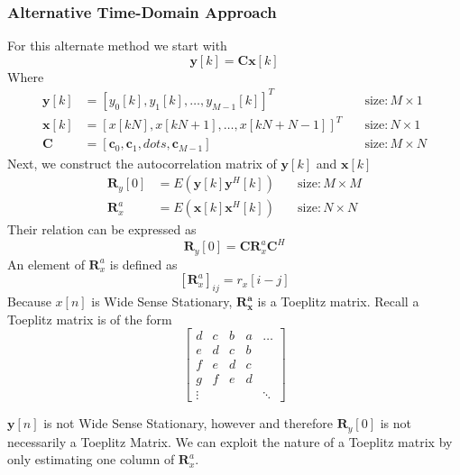 \documentclass[report, oneside, a4paper, openany]{memoir}
\begin{document}
\subsubsection{Alternative Time-Domain Approach}
For this alternate method we start with 
$$
\mathbf{y}[k] = \mathbf{Cx}[k]
$$
Where 
\begin{equation*}
\begin{alignedat}{2}
\mathbf{y}[k] &= [y_0[k], y_1[k],\dots,y_{M-1}[k]]^T \quad &\text{size}: M \times 1\\
\mathbf{x}[k] &= [x[kN],x[kN+1],\dots, x[kN+N-1]]^T \quad &\text{size}: N \times 1\\
\mathbf{C} &= [\mathbf{c}_0,\mathbf{c}_1,dots,\mathbf{c}_{M-1}] \quad &\text{size}: M \times N
\end{alignedat}
\end{equation*}
Next, we construct the autocorrelation matrix of $\mathbf{y}[k]$ and $\mathbf{x}[k]$
\begin{equation*}
\begin{alignedat}{2}
\mathbf{R}_y[0] &= E(\mathbf{y}[k]\mathbf{y}^H[k]) \quad &\text{size}: M \times M \\
\mathbf{R}_x^a &= E(\mathbf{x}[k]\mathbf{x}^H[k]) \quad &\text{size}: N \times N
\end{alignedat}
\end{equation*}
Their relation can be expressed as
$$
\mathbf{R}_y[0] = \mathbf{CR}_x^a\mathbf{C}^H
$$
An element of $\mathbf{R}_x^a$ is defined as 
$$[\mathbf{R}_x^a]_{ij} = r_x[i-j]$$ 
Because $x[n]$ is Wide Sense Stationary, $\mathbf{R_x^a}$ is a Toeplitz matrix. 
Recall a Toeplitz matrix is of the form
$$
\begin{bmatrix}
d &c & b & a & \dots \\
e & d & c & b & ~ \\
f & e & d & c & ~ \\
g & f & e & d & ~ \\
\vdots & ~ & ~ & ~& \ddots
\end{bmatrix}
$$

$\mathbf{y}[n]$ is not Wide Sense Stationary, however and therefore $\mathbf{R}_y[0]$ is not necessarily a Toeplitz Matrix.
We can exploit the nature of a Toeplitz matrix by only estimating one column of $\mathbf{R}_x^a$. \\
\end{document}
